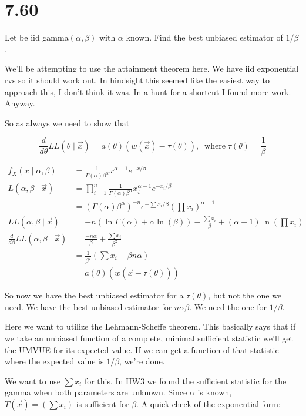 \section*{7.60}

Let \rs be iid gamma$(\alpha, \beta)$ with $\alpha$ known. Find the best unbiased estimator of $1/\beta$.

We'll be attempting to use the attainment theorem here. We have iid exponential rvs so it should work out. In hindsight this seemed like the easiest way to approach this, I don't think it was. In a hunt for a shortcut I found more work. Anyway. 

So as always we need to show that

\[
	\frac{d}{d\theta} LL(\theta \mid \vec{x}) = a(\theta)(w(\vec{x}) - \tau(\theta)), \;\; \text{where}\; \tau(\theta) = \frac{1}{\beta}
\]

\begin{align*}
	f_X(x \mid \alpha, \beta) &= \frac{1}{\Gamma(\alpha) \beta^{\alpha}} x^{\alpha - 1} e^{-x / \beta} \\
	L(\alpha, \beta \mid \vec{x}) &= \prod_{i=1}^n \frac{1}{\Gamma(\alpha) \beta^{\alpha}} x_i^{\alpha - 1} e^{-x_i / \beta} \\
	&= (\Gamma(\alpha)\beta^{\alpha})^{-n} e^{-\sum x_i / \beta} \left( \prod x_i \right)^{\alpha - 1} \\
	LL(\alpha, \beta \mid \vec{x}) &= -n(\ln\Gamma(\alpha) + \alpha\ln(\beta)) - \frac{\sum x_i}{\beta} + (\alpha - 1)\ln\left( \prod x_i \right) \\
	\frac{d}{d\beta} LL(\alpha, \beta \mid \vec{x}) &= \frac{-n\alpha}{\beta} + \frac{\sum x_i}{\beta^2} \\
	&= \frac{1}{\beta^2}\left( \sum x_i - \beta n \alpha \right) \\
	&= a(\theta)(w(\vec{x} - \tau(\theta)))
\end{align*}

So now we have the best unbiased estimator for a $\tau(\theta)$, but not the one we need. We have the best unbiased estimator for $n\alpha \beta$. We need the one for $1/\beta$. 

Here we want to utilize the Lehmann-Scheffe theorem. This basically says that if we take an unbiased function of a complete, minimal sufficient statistic we'll get the UMVUE for its expected value. If we can get a function of that statistic where the expected value is $1/\beta$, we're done. 

We want to use $\sum x_i$ for this. In HW3 we found the sufficient statistic for the gamma when both parameters are unknown. Since $\alpha$ is known, $T(\vec{x}) = \left( \sum x_i \right)$ is sufficient for $\beta$. A quick check of the exponential form:

